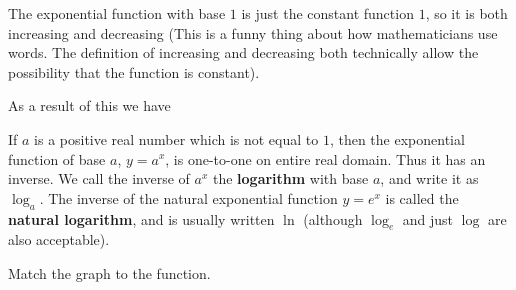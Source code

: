 \documentclass{ximera}
\begin{document}
The exponential function with base $1$ is just the constant function $1$, so it is both increasing and decreasing (This is a funny thing about how mathematicians use words.  The definition of increasing and decreasing both technically allow the possibility that the function is constant).

As a result of this we have 

\begin{theorem}
	If $a$ is a positive real number which is not equal to $1$, then the exponential function of base $a$, $y = a^x$, is one-to-one on entire real domain.  Thus it has an inverse.  We call the inverse of $a^x$ the\textbf{ logarithm} with base $a$, and write it as $\log_a$.  The inverse of the natural exponential function $y=e^x$ is called the \textbf{natural logarithm}, and is usually written $\ln$ (although $\log_e$ and just $\log$ are also acceptable).
\end{theorem}

\begin{question}
	Match the graph to the function.

\begin{image}
\end{image} 

\[

\]
\end{question}
\end{document}

